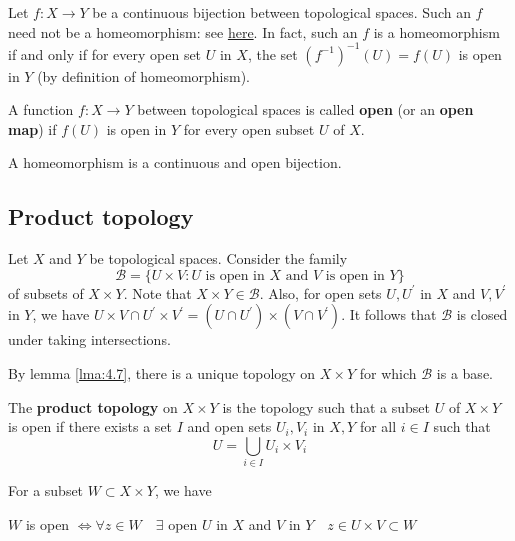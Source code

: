 \documentclass[a4paper,11pt]{article}
\begin{document}
\begin{note}
    Let $f: X \rightarrow Y$ be a continuous bijection between topological spaces. Such an $f$ need not be a homeomorphism: see \href{https://math.stackexchange.com/questions/378717/finding-counterexamples-bijective-continuous-functions-that-are-not-homeomorphi}{here}. In fact, such an $f$ is a homeomorphism if and only if for every open set $U$ in $X$, the set $\left(f^{-1}\right)^{-1}(U)=f(U)$ is open in $Y$ (by definition of homeomorphism).
\end{note}

\begin{definition}
    A function $f: X \rightarrow Y$ between topological spaces is called \textbf{open} (or an \textbf{open map}) if $f(U)$ is open in $Y$ for every open subset $U$ of $X$.
\end{definition}

\begin{remark}
    A homeomorphism is a continuous and open bijection.
\end{remark}

\subsection{Product topology}
Let $X$ and $Y$ be topological spaces. Consider the family
$$
\mathcal{B}=\{U \times V: U \text { is open in } X \text { and } V \text { is open in } Y\}
$$
of subsets of $X \times Y$. Note that $X \times Y \in \mathcal{B}$. Also, for open sets $U, U^{\prime}$ in $X$ and $V, V^{\prime}$ in $Y$, we have $U \times V \cap U^{\prime} \times V^{\prime}=\left(U \cap U^{\prime}\right) \times\left(V \cap V^{\prime}\right)$. It follows that $\mathcal{B}$ is closed under taking intersections.

By lemma \ref{lma:4.7}, there is a unique topology on $X \times Y$ for which $\mathcal{B}$ is a base. 

\begin{definition}
    The \textbf{product topology} on \( X \times Y \) is the topology such that a subset \( U \) of \( X \times Y \) is open if there exists a set \( I \) and open sets \( U_i, V_i \) in \( X, Y \) for all \( i \in I \) such that
	\[
		U = \bigcup_{i \in I} U_i \times V_i
	\]
\end{definition}

\begin{note}
    For a subset $W \subset X \times Y$, we have

\begin{center}
    $W$ is open $\Longleftrightarrow \forall z \in W \quad \exists$ open $U$ in $X$ and $V$ in $Y \quad z \in U \times V \subset W$
\end{center}
\end{note}
\end{document}
